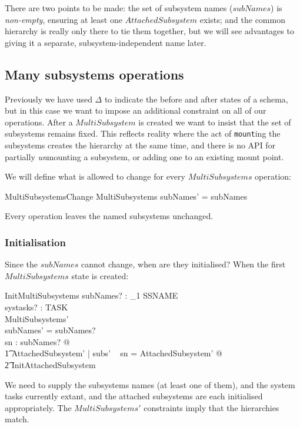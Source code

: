 \documentclass[a4paper,twoside,12pt]{article}
\begin{document}
There are two points to be made: the set of subsystem names ($subNames$) is \emph{non-empty}, ensuring at least
one $AttachedSubsystem$ exists; and the common hierarchy is really only there to tie them together, but
we will see advantages to giving it a separate, subsystem-independent name later.

\subsection{Many subsystems operations}

Previously we have used $\Delta$ to indicate the before and after states of a schema, but in this case we want to
impose an additional constraint on all of our operations. After a $MultiSubsystem$ is created we want to insist that
the set of subsystems remains fixed. This reflects reality where the act of \texttt{mount}ing the subsystems creates the
hierarchy at the same time, and there is no API for partially \emph{un}mounting a subsystem, or adding one to an existing mount point.

We will define what is allowed to change for every $MultiSubsystems$ operation:

\begin{schema}{MultiSubsystemsChange}
\Delta MultiSubsystems
\where
subNames' = subNames
\end{schema}
Every operation leaves the named subsystems unchanged.

\subsubsection{Initialisation}

Since the $subNames$ cannot change, when are they initialised? When the first $MultiSubsystems$ state is created:

\begin{schema}{InitMultiSubsystems}
subNames? : \finset_1 SSNAME \\
systasks? : \finset TASK \\
MultiSubsystems' \\
\where
subNames' = subNames? \\
\forall sn : subNames? @ \\
\t1 \exists AttachedSubsystem' | subs' ~ sn = \theta AttachedSubsystem' @ \\
    \t2 InitAttachedSubsystem
\end{schema}
We need to supply the subsystems names (at least one of them), and the system tasks currently
extant, and the attached subsystems are each
initialised appropriately. The $MultiSubsystems'$ constraints imply that the hierarchies match.
\end{document}
